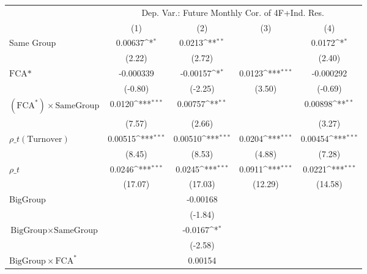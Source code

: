{
\def\sym#1{\ifmmode^{#1}\else\(^{#1}\)\fi}
\begin{tabular}{l*{4}{c}}
\hline\hline
                &\multicolumn{4}{c}{Dep. Var.: Future Monthly Cor.  of 4F+Ind. Res.}        \\\cmidrule(lr){2-5}
                &\multicolumn{1}{c}{(1)}         &\multicolumn{1}{c}{(2)}         &\multicolumn{1}{c}{(3)}         &\multicolumn{1}{c}{(4)}         \\
\hline
Same Group      &  0.00637\sym{*}  &   0.0213\sym{**} &                  &   0.0172\sym{*}  \\
                &   (2.22)         &   (2.72)         &                  &   (2.40)         \\
[1em]
$ \text{FCA*} $ &-0.000339         & -0.00157\sym{*}  &   0.0123\sym{***}&-0.000292         \\
                &  (-0.80)         &  (-2.25)         &   (3.50)         &  (-0.69)         \\
[1em]
 $ (\text{FCA}^*) \times {\text{SameGroup} }  $ &   0.0120\sym{***}&  0.00757\sym{**} &                  &  0.00898\sym{**} \\
                &   (7.57)         &   (2.66)         &                  &   (3.27)         \\
[1em]
 $ {\rho\_t(\text{Turnover})} $ &  0.00515\sym{***}&  0.00510\sym{***}&   0.0204\sym{***}&  0.00454\sym{***}\\
                &   (8.45)         &   (8.53)         &   (4.88)         &   (7.28)         \\
[1em]
 $ {\rho\_t} $   &   0.0246\sym{***}&   0.0245\sym{***}&   0.0911\sym{***}&   0.0221\sym{***}\\
                &  (17.07)         &  (17.03)         &  (12.29)         &  (14.58)         \\
[1em]
BigGroup        &                  & -0.00168         &                  &                  \\
                &                  &  (-1.84)         &                  &                  \\
[1em]
$ {\text{BigGroup} } \times {\text{SameGroup} }  $ &                  &  -0.0167\sym{*}  &                  &                  \\
                &                  &  (-2.58)         &                  &                  \\
[1em]
$ {\text{BigGroup} } \times \text{FCA}^*  $ &                  &  0.00154         &                  &                  \\

\end{tabular}}
